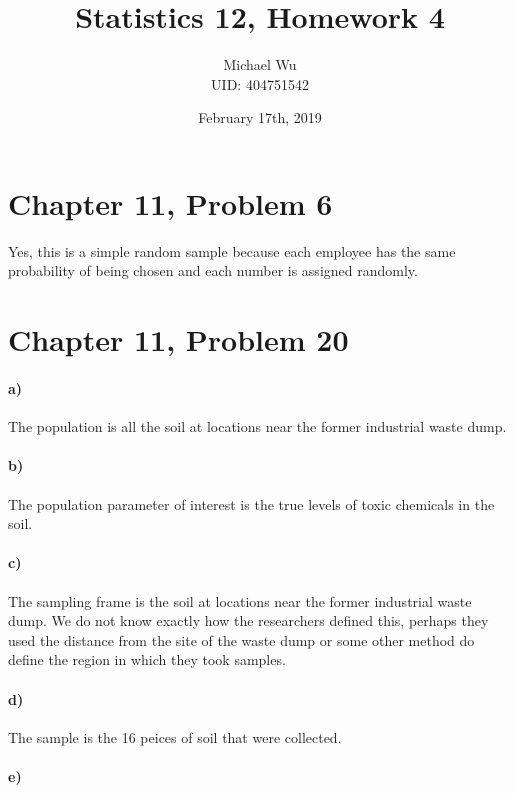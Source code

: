 \documentclass[12pt]{article}
\begin{document}
\title{Statistics 12, Homework 4}
\date{February 17th, 2019}
\author{Michael Wu\\UID: 404751542}
\maketitle

\section*{Chapter 11, Problem 6}

Yes, this is a simple random sample because each employee has the same probability of being
chosen and each number is assigned randomly.

\section*{Chapter 11, Problem 20}

\paragraph{a)}

The population is all the soil at locations near the former industrial waste dump.

\paragraph{b)}

The population parameter of interest is the true levels of toxic chemicals in the
soil.

\paragraph{c)}

The sampling frame is the soil at locations near the former industrial waste dump.
We do not know exactly how the researchers defined this, perhaps they used
the distance from the site of the waste dump or some other method do define the
region in which they took samples.

\paragraph{d)}

The sample is the 16 peices of soil that were collected.

\paragraph{e)}
\end{document}
